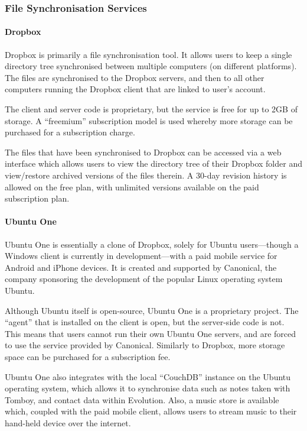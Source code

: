 \subsubsection{File Synchronisation Services}

\paragraph{Dropbox}

Dropbox is primarily a file synchronisation tool. It allows users to keep
a single directory tree synchronised between multiple computers (on different
platforms). The files are synchronised to the Dropbox servers, and then to all
other computers running the Dropbox client that are linked to user's account.

The client and server code is proprietary, but the service is free for up to
2GB of storage. A ``freemium'' subscription model is used whereby more storage
can be purchased for a subscription charge.

The files that have been synchronised to Dropbox can be accessed via a web
interface which allows users to view the directory tree of their Dropbox folder
and view/restore archived versions of the files therein. A 30-day revision
history is allowed on the free plan, with unlimited versions available on the
paid subscription plan.

\paragraph{Ubuntu One}

Ubuntu One is essentially a clone of Dropbox, solely for Ubuntu users---though
a Windows client is currently in development---with a paid mobile service for
Android and iPhone devices. It is created and supported by Canonical, the
company sponsoring the development of the popular Linux operating system
Ubuntu.

Although Ubuntu itself is open-source, Ubuntu One is a proprietary project. The
``agent'' that is installed on the client is open, but the server-side code is
not. This means that users cannot run their own Ubuntu One servers, and are
forced to use the service provided by Canonical. Similarly to Dropbox, more storage space can
be purchased for a subscription fee.

Ubuntu One also integrates with the local ``CouchDB'' instance on the Ubuntu
operating system, which allows it to synchronise data such as notes taken with
Tomboy, and contact data within Evolution. Also, a music store is available
which, coupled with the paid mobile client, allows users to stream music to
their hand-held device over the internet.


